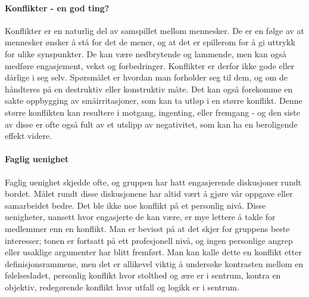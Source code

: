 \paragraph{Konflikter - en god ting?}

Konflikter er en naturlig del av samspillet mellom mennesker. De er en følge av at mennesker ønsker å stå for det de mener, og at det er spillerom for å gi uttrykk for ulike synspunkter. De kan være nedbrytende og lammende, men kan også medføre engasjement, vekst og forbedringer. Konflikter er derfor ikke gode eller dårlige i seg selv. Spørsmålet er hvordan man forholder seg til dem, og om de håndteres på en destruktiv eller konstruktiv måte.\cite{helsekompetanse} Det kan også forekomme en sakte oppbygging av småirritasjoner, som kan ta utløp i en større konflikt. Denne større konflikten kan resultere i motgang, ingenting, eller fremgang - og den siste av disse er ofte også fult av et utslipp av negativitet, som kan ha en beroligende effekt videre. 

\paragraph{Faglig uenighet}
Faglig uenighet skjedde ofte, og gruppen har hatt engasjerende diskusjoner rundt bordet. Målet rundt disse diskusjonene har altid vært å gjøre vår oppgave eller samarbeidet bedre. Det ble ikke noe konflikt på et personlig nivå. Disse uenigheter, uansett hvor engasjerte de kan være, er mye lettere å takle for medlemmer enn en konflikt. Man er bevisst på at det skjer for gruppens beste interesser; tonen er fortsatt på ett profesjonell nivå, og ingen personlige angrep eller usaklige argumenter har blitt fremført. Man kan kalle dette en konflikt etter definisjonsrammene, men det er allikevel viktig å undersøke kontrasten mellom en følelsesladet, personlig konflikt hvor stolthed og ære er i sentrum, kontra en objektiv, redegørende konflikt hvor utfall og logikk er i sentrum. 






